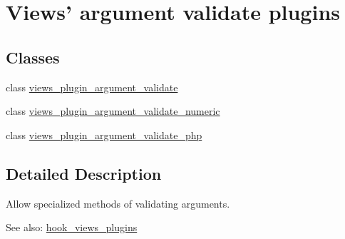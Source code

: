 \hypertarget{group__views__argument__validate__plugins}{
\section{Views' argument validate plugins}
\label{group__views__argument__validate__plugins}
}
\subsection*{Classes}
\begin{CompactItemize}
\item 
class \hyperlink{classviews__plugin__argument__validate}{views\_\-plugin\_\-argument\_\-validate}
\item 
class \hyperlink{classviews__plugin__argument__validate__numeric}{views\_\-plugin\_\-argument\_\-validate\_\-numeric}
\item 
class \hyperlink{classviews__plugin__argument__validate__php}{views\_\-plugin\_\-argument\_\-validate\_\-php}
\end{CompactItemize}


\subsection{Detailed Description}
Allow specialized methods of validating arguments.

\begin{Desc}
\item[See also:]\hyperlink{group__views__hooks_g23f6e9972b2ed84fc54b7ff63f44477d}{hook\_\-views\_\-plugins} \end{Desc}
